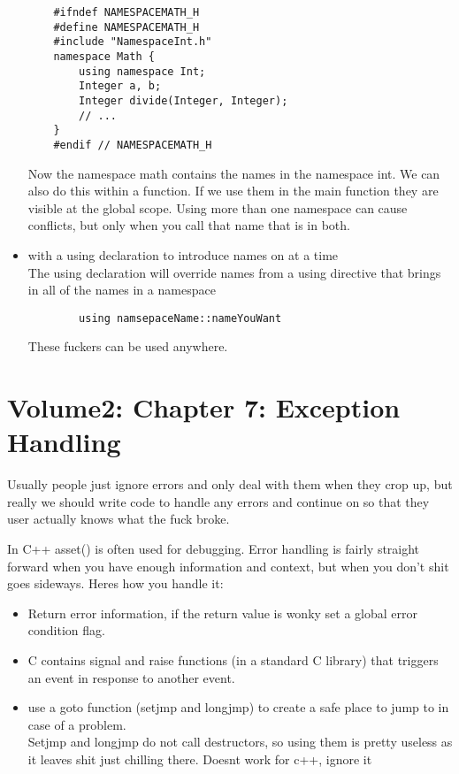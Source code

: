 \documentclass[12pt]{article}
\begin{document}
\begin{itemize}
\begin{lstlisting}
    #ifndef NAMESPACEMATH_H
    #define NAMESPACEMATH_H
    #include "NamespaceInt.h"
    namespace Math {
        using namespace Int;
        Integer a, b;
        Integer divide(Integer, Integer);
        // ...
    }
    #endif // NAMESPACEMATH_H
    \end{lstlisting}
    Now the namespace math contains the names in the namespace int. We can also do this within a function. If we use them in the main function they are visible at the global scope. Using more than one namespace can cause conflicts, but only when you call that name that is in both.
    \item with a using declaration to introduce names on at a time\\
    The using declaration will override names from a using directive that brings in all of the names in a namespace
    \begin{lstlisting}
        using namsepaceName::nameYouWant
    \end{lstlisting}
    These fuckers can be used anywhere.
\end{itemize}

\section*{Volume2: Chapter 7: Exception Handling}
Usually people just ignore errors and only deal with them when they crop up, but really we should write code to handle any errors and continue on so that they user actually knows what the fuck broke.

In C++ asset() is often used for debugging. Error handling is fairly straight forward when you have enough information and context, but when you don't shit goes sideways. Heres how you handle it:
\begin{itemize}
    \item Return error information, if the return value is wonky set a global error condition flag.
    \item C contains signal and raise functions (in a standard C library) that triggers an event in response to another event.
    \item use a goto function (setjmp and longjmp) to create a safe place to jump to in case of a problem. \\
    Setjmp and longjmp do not call destructors, so using them is pretty useless as it leaves shit just chilling there. Doesnt work for c++, ignore it
\end{itemize}
\end{document}
